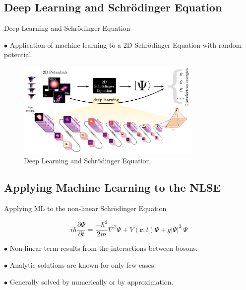 \documentclass{beamer}
\begin{document}
\subsection{Deep Learning and Schr{\"o}dinger Equation}

\begin{frame}{Deep Learning and Schr{\"o}dinger Equation}

$\bullet$ Application of machine learning to a 2D Schr{\"o}dinger Equation with random potential.

\begin{figure}[Htb!]
\includegraphics[width=0.8\textwidth]{DPandSE.png}
\caption{\label{fig:DPandSE} Deep Learning and Schr{\"o}dinger Equation.}
\end{figure}

\end{frame}

%
%
%
%

\subsection{Applying Machine Learning to the NLSE}

\begin{frame}{Applying ML to the non-linear Schr{\"o}dinger Equation}

$$i \hbar \frac {\partial \Psi}{\partial t} = \frac {-\hbar^2}{2m}\nabla^2
\Psi + V(\boldsymbol{r}, t)\Psi + g|\Psi|^2\ \Psi$$

\vskip 0.5cm

$\bullet$ Non-linear term results from the interactions between bosons.

\vskip 0.5cm

$\bullet$ Analytic solutions are known for only few cases.

\vskip 0.5cm

$\bullet$ Generally solved by numerically or by approximation.


\end{frame}
\end{document}
